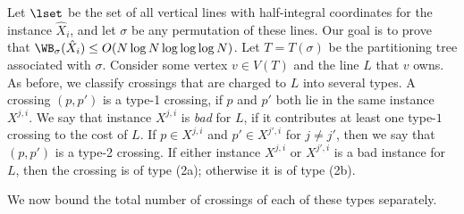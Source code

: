 \documentclass[11pt]{article}
\numberwithin{equation}{section}
\theoremstyle{definition}
\theoremstyle{plain}
\begin{document}
Let $\lset$ be the set of all vertical lines with half-integral  coordinates for the instance $\hat X_i$, and let $\sigma$ be any permutation of these lines. Our goal is to prove that $\WB_{\sigma}(\hat X_i)\leq O(N\log N\log\log\log N)$. Let $T=T(\sigma)$ be the partitioning tree associated with $\sigma$. Consider some vertex $v\in V(T)$ and the line $L$ that $v$ owns. As before, we classify crossings that are charged to $L$ into several types. A crossing $(p,p')$ is a type-1 crossing, if $p$ and $p'$ both lie in the same instance $X^{j,i}$. We say that instance $X^{j,i}$ is \emph{bad} for $L$, if it contributes at least one type-$1$ crossing to the cost of $L$. If $p\in X^{j,i}$ and $p'\in X^{j',i}$ for $j\neq j'$, then we say that $(p,p')$ is a type-2 crossing. If either instance $X^{j,i}$ or $X^{j',i}$ is a bad instance for $L$, then the crossing is of type (2a); otherwise it is of type (2b). 

We now bound the total number of crossings of each of these types separately.
\end{document}
